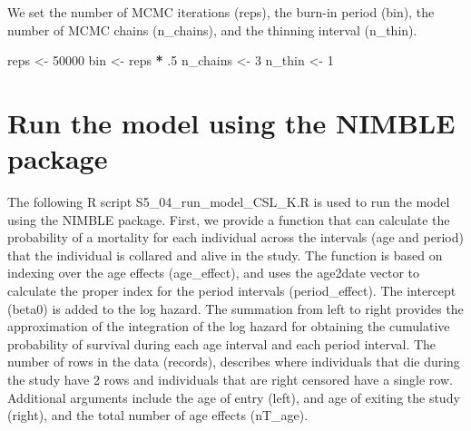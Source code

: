 \documentclass[11pt,]{article}
\newenvironment{Shaded}{\begin{snugshade}}{\end{snugshade}}
\newcommand{\DecValTok}[1]{\textcolor[rgb]{0.00,0.00,0.81}{#1}}
\newcommand{\StringTok}[1]{\textcolor[rgb]{0.31,0.60,0.02}{#1}}
\newcommand{\OperatorTok}[1]{\textcolor[rgb]{0.81,0.36,0.00}{\textbf{#1}}}
\newcommand{\NormalTok}[1]{#1}
\begin{document}
We set the number of MCMC iterations (reps), the burn-in period (bin),
the number of MCMC chains (n\_chains), and the thinning interval
(n\_thin).

\begin{Shaded}
\begin{Highlighting}[]
\NormalTok{reps <-}\StringTok{ }\DecValTok{50000}
\NormalTok{bin <-}\StringTok{ }\NormalTok{reps }\OperatorTok{*}\StringTok{ }\NormalTok{.}\DecValTok{5}
\NormalTok{n_chains <-}\StringTok{ }\DecValTok{3}
\NormalTok{n_thin <-}\StringTok{ }\DecValTok{1}
\end{Highlighting}
\end{Shaded}

\section{Run the model using the NIMBLE
package}\label{run-the-model-using-the-nimble-package}

The following R script S5\_04\_run\_model\_CSL\_K.R is used to run the
model using the NIMBLE package. First, we provide a function that can
calculate the probability of a mortality for each individual across the
intervals (age and period) that the individual is collared and alive in
the study. The function is based on indexing over the age effects
(age\_effect), and uses the age2date vector to calculate the proper
index for the period intervals (period\_effect). The intercept (beta0)
is added to the log hazard. The summation from left to right provides
the approximation of the integration of the log hazard for obtaining the
cumulative probability of survival during each age interval and each
period interval. The number of rows in the data (records), describes
where individuals that die during the study have 2 rows and individuals
that are right censored have a single row. Additional arguments include
the age of entry (left), and age of exiting the study (right), and the
total number of age effects (nT\_age).
\end{document}
